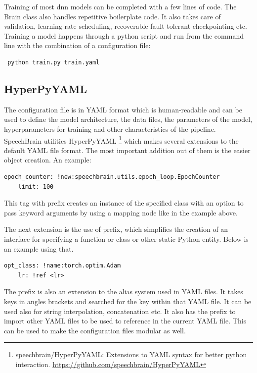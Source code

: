 Training of most \acrshort{dnn} models can be completed with a few lines of code. The Brain class also handles repetitive boilerplate code. It also takes care of validation, learning rate scheduling, recoverable fault tolerant checkpointing etc. Training a model happens through a python script and run from the command line with the combination of a configuration file: 
\begin{verbatim} python train.py train.yaml\end{verbatim}

\subsection{HyperPyYAML}
The configuration file is in YAML format which is human-readable and can be used to define the model architecture, the data files, the parameters of the model, hyperparameters for training and other characteristics of the pipeline. SpeechBrain utilities HyperPyYAML \footnote{speechbrain/HyperPyYAML:  Extensions  to  YAML  syntax  for  better python interaction. \href{https://github.com/speechbrain/HyperPyYAML}{https://github.com/speechbrain/HyperPyYAML} } which makes several extensions to the default YAML file format. The most important addition out of them is the easier object creation. An example:

\begin{verbatim}
epoch_counter: !new:speechbrain.utils.epoch_loop.EpochCounter
    limit: 100
\end{verbatim}

This tag with prefix  creates an instance of the specified class with an option to pass keyword arguments by using a mapping node like in the example above.

The next extension is the use of prefix,  which simplifies the creation of an interface for specifying a function or class or other static Python entity. Below is an example using that.
\begin{verbatim}
opt_class: !name:torch.optim.Adam
    lr: !ref <lr>
\end{verbatim}
The prefix  is also an extension to the alias system used in YAML files. It takes keys in angles brackets and searched for the key within that YAML file. It can be used also for string interpolation, concatenation etc. It also has the  prefix to import other YAML files to be used to reference in the current YAML file. This can be used to make the configuration files modular as well. 

